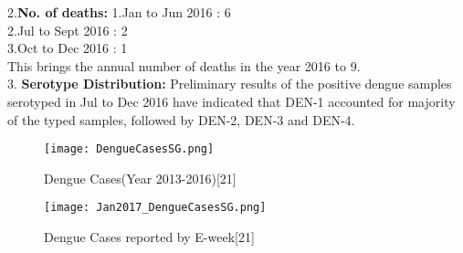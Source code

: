 \documentclass[11pt]{exam}
\begin{document}
\begin{questions}
2.\textbf{No. of deaths:} 1.Jan to Jun 2016 : 6 \\
                          2.Jul to Sept 2016 : 2 \\
                          3.Oct to Dec 2016 : 1\\
This brings the annual number of deaths in the year 2016 to 9. \\
                          
3. \textbf{Serotype Distribution:} Preliminary results of the positive dengue samples serotyped in Jul to Dec 2016 have indicated that DEN-1 accounted for majority of the typed samples, followed by DEN-2, DEN-3 and DEN-4. \\ 
\begin{figure}[H]
  \centering
   \texttt{[image: DengueCasesSG.png]}
  \caption{Dengue Cases(Year 2013-2016)[21]}
   \label{Dengue Cases in Singapore 2013-2017}
\end{figure} 

\begin{figure}[H]
  \centering
   \texttt{[image: Jan2017\_DengueCasesSG.png]}
  \caption{Dengue Cases reported by E-week[21]} %
   \label{Dengue Cases reported by E-week}
\end{figure} 

%
%
%
%






\end{questions}
\end{document}
